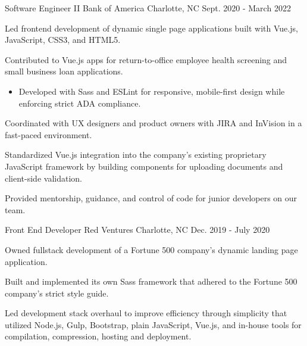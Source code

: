 \begin{cventries}
\cventry
{Software Engineer II} %
{Bank of America} %
{Charlotte, NC} %
{Sept. 2020 - March 2022} %
{
  \begin{cvitems} %
    \item {Led frontend development of dynamic single page applications built with Vue.js, JavaScript, CSS3, and HTML5.}
    \item {Contributed to Vue.js apps for return-to-office employee health screening and small business loan applications.}
    \begin{itemize}[leftmargin=2.5ex]
      \vspace{.7mm}
      \item {Developed with Sass and ESLint for responsive, mobile-first design while enforcing strict ADA compliance.}
      \vspace{.5mm}
    \end{itemize}
    \item {Coordinated with UX designers and product owners with JIRA and InVision in a fast-paced environment.}
    \item {Standardized Vue.js integration into the company's existing proprietary JavaScript framework by building components for uploading documents and client-side validation.}
    \item {Provided mentorship, guidance, and control of code for junior developers on our team.}
  \end{cvitems}
}

  \cventry
    {Front End Developer} %
    {Red Ventures} %
    {Charlotte, NC} %
    {Dec. 2019 - July 2020} %
    {
      \begin{cvitems} %
        \item {Owned fullstack development of a Fortune 500 company's dynamic landing page application.}
        \item {Built and implemented its own Sass framework that adhered to the Fortune 500 company's strict style guide.}
        \item {Led development stack overhaul to improve efficiency through simplicity that utilized Node.js, Gulp, Bootstrap, plain JavaScript, Vue.js, and in-house tools for compilation, compression, hosting and deployment.}
      \end{cvitems}
    }


\end{cventries}
